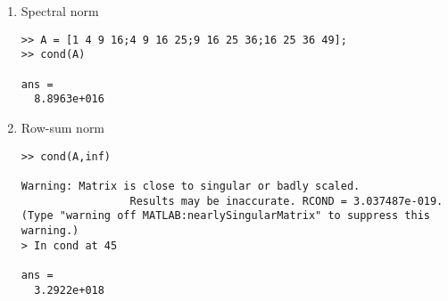 \documentclass[../main.tex]{subfiles}
\begin{document}
\section{}
\begin{enumerate}[label=\bfseries(\alph*)]
\item Spectral norm
\bigbreak
\begin{lstlisting}[numbers=none]
>> A = [1 4 9 16;4 9 16 25;9 16 25 36;16 25 36 49];
>> cond(A)

ans =
  8.8963e+016
\end{lstlisting}
\bigbreak
\item Row-sum norm
\bigbreak
\begin{lstlisting}[numbers=none]
>> cond(A,inf)

Warning: Matrix is close to singular or badly scaled.
				 Results may be inaccurate. RCOND = 3.037487e-019.
(Type "warning off MATLAB:nearlySingularMatrix" to suppress this
warning.)
> In cond at 45

ans =
  3.2922e+018
\end{lstlisting}
\end{enumerate}
\bigbreak
\end{document}

